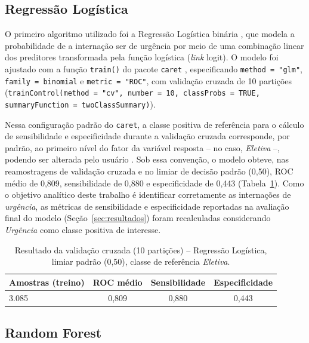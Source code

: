 \documentclass[12pt,a4paper]{article}
\begin{document}
\subsection{Regressão Logística}

O primeiro algoritmo utilizado foi a Regressão Logística binária \cite{hosmer2013}, que modela a probabilidade de a internação ser de urgência por meio de uma combinação linear dos preditores transformada pela função logística (\textit{link} logit). O modelo foi ajustado com a função \texttt{train()} do pacote \texttt{caret} \cite{kuhn2008}, especificando \texttt{method = "glm"}, \texttt{family = binomial} e \texttt{metric = "ROC"}, com validação cruzada de 10 partições (\texttt{trainControl(method = "cv", number = 10, classProbs = TRUE, summaryFunction = twoClassSummary)}).

Nessa configuração padrão do \texttt{caret}, a classe positiva de referência para o cálculo de sensibilidade e especificidade durante a validação cruzada corresponde, por padrão, ao primeiro nível do fator da variável resposta -- no caso, \emph{Eletiva} --, podendo ser alterada pelo usuário \cite{kuhn2008}. Sob essa convenção, o modelo obteve, nas reamostragens de validação cruzada e no limiar de decisão padrão (0,50), ROC médio de 0,809, sensibilidade de 0,880 e especificidade de 0,443 (Tabela~\ref{tab:glm_cv}). Como o objetivo analítico deste trabalho é identificar corretamente as internações de \emph{urgência}, as métricas de sensibilidade e especificidade reportadas na avaliação final do modelo (Seção~\ref{sec:resultados}) foram recalculadas considerando \emph{Urgência} como classe positiva de interesse.

\begin{table}[H]
\centering
\caption{Resultado da validação cruzada (10 partições) -- Regressão Logística, limiar padrão (0,50), classe de referência \emph{Eletiva}.}
\label{tab:glm_cv}
\begin{tabular}{lccc}
\toprule
Amostras (treino) & ROC médio & Sensibilidade & Especificidade \\
\midrule
3.085 & 0,809 & 0,880 & 0,443 \\
\bottomrule
\end{tabular}
\end{table}

\subsection{Random Forest}
\end{document}
